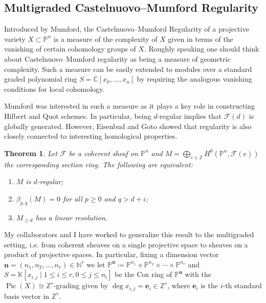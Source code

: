 \documentclass[11pt,reqno]{amsart}
\newtheorem{theorem}[lemma]{Theorem}
\newtheorem{defn}[lemma]{Definition}
\theoremstyle{remark}
\newcommand{\reg}{\operatorname{reg}}
\newcommand{\Pic}{\operatorname{Pic}}
\newcommand{\ee}{\mathbf e}
\newcommand{\nn}{\mathbf n}
\newcommand{\cF}{\mathcal{F}}
\newcommand{\C}{\mathbb{C}}
\newcommand{\K}{\mathbb{K}}
\newcommand{\N}{\mathbb{N}}
\renewcommand{\P}{\mathbb{P}}
\newcommand{\Z}{\mathbb{Z}}
\begin{document}
\subsection{Multigraded Castelnuovo–Mumford Regularity}\label{subsec:prior-mgreg}

Introduced by Mumford, the Castelnuovo–Mumford Regularity of a projective variety $X\subset \P^{n}$ is a measure of the complexity of $X$ given in terms of the vanishing of certain cohomology groups of $X$. Roughly speaking one should think about Castelnuovo--Mumford regularity as being a measure of geometric complexity. Such a measure can be easily extended to modules over a standard graded polynomial ring $S=\C[x_{0},\ldots,x_{n}]$ by requiring the analogous vanishing conditions for local cohomology. 

%

Mumford was interested in such a measure as it plays a key role in constructing Hilbert and Quot schemes. In particular, being $d$-regular implies that $\cF(d)$ is globally generated. However, Eisenbud and Goto showed that regularity is also closely connected to interesting homological properties.

\begin{theorem}\cite{eisenbudGoto84}\label{thm:eisenbud-goto}
Let $\cF$ be a coherent sheaf on $\P^{n}$ and $M=\bigoplus_{e\in\Z} H^0(\P^{n},\cF(e))$ the corresponding section ring. The following are equivalent:
\begin{enumerate}
\item $M$ is $d$-regular;
\item $\beta_{p,q}(M)=0$ for all $p\geq0$ and $q>d+i$;
\item $M_{\geq d}$ has a linear resolution. 
\end{enumerate}
\end{theorem}

My collaborators and I have worked to generalize this result to the multigraded setting, i.e. from coherent sheaves on a single projective space to sheaves on a product of projective spaces. In particular, fixing a dimension vector $\nn=(n_1,n_2,\ldots,n_{r})\in \N^{r}$ we let $\P^{\nn}\coloneqq \P^{n_1}\times \P^{n_2}\times \cdots \times \P^{n_r}$ and $S=\K[x_{i,j} \; |\; 1\leq i \leq r, 0\leq j \leq n_{i}]$ be the Cox ring of $\P^{\nn}$ with the $\Pic(X)\cong \Z^{r}$-grading given by $\deg x_{i,j} = \ee_{i} \in \Z^{r}$, where $\ee_{i}$ is the $i$-th standard basis vector in $\Z^{r}$. 
\end{document}
